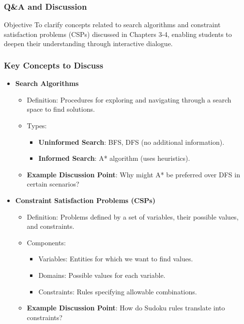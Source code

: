 \documentclass[aspectratio=169]{beamer}
\begin{document}
\begin{frame}[fragile]
    \frametitle{Q\&A and Discussion}
    \begin{block}{Objective}
        To clarify concepts related to search algorithms and constraint satisfaction problems (CSPs) discussed in Chapters 3-4, enabling students to deepen their understanding through interactive dialogue.
    \end{block}
\end{frame}

\begin{frame}[fragile]
    \frametitle{Key Concepts to Discuss}
    \begin{itemize}
        \item \textbf{Search Algorithms}
            \begin{itemize}
                \item Definition: Procedures for exploring and navigating through a search space to find solutions.
                \item Types:
                    \begin{itemize}
                        \item \textbf{Uninformed Search}: BFS, DFS (no additional information).
                        \item \textbf{Informed Search}: A* algorithm (uses heuristics).
                    \end{itemize}
                \item \textbf{Example Discussion Point}: Why might A* be preferred over DFS in certain scenarios?
            \end{itemize}

        \item \textbf{Constraint Satisfaction Problems (CSPs)}
            \begin{itemize}
                \item Definition: Problems defined by a set of variables, their possible values, and constraints.
                \item Components:
                    \begin{itemize}
                        \item Variables: Entities for which we want to find values.
                        \item Domains: Possible values for each variable.
                        \item Constraints: Rules specifying allowable combinations.
                    \end{itemize}
                \item \textbf{Example Discussion Point}: How do Sudoku rules translate into constraints?
            \end{itemize}
    \end{itemize}
\end{frame}
\end{document}
